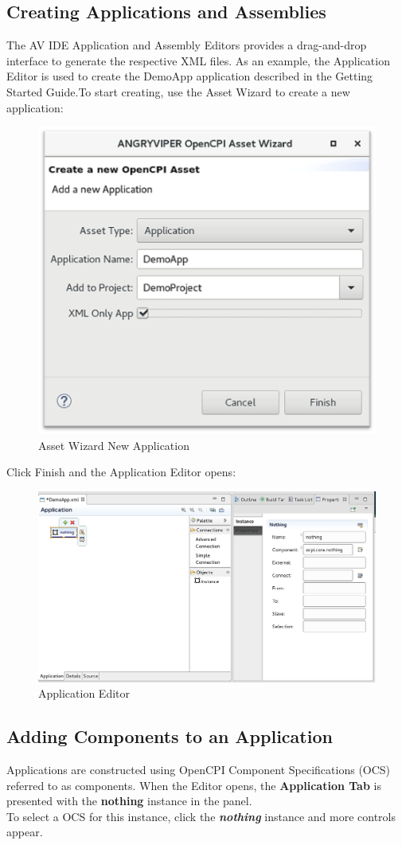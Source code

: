\documentclass[10pt, a4paper, oneside]{article}
\begin{document}
\subsection{Creating Applications and Assemblies}
The AV IDE Application and Assembly Editors provides a drag-and-drop interface to generate the respective XML files. As an example, the Application Editor is used to create the DemoApp application described in the Getting Started Guide.To start creating, use the Asset Wizard to create a new application:\\
\begin{figure}[h!]
	\centering
	\caption{Asset Wizard New Application}{}
	\includegraphics[width=.65\textwidth]{Application_Asset.png}
 \end{figure}

Click Finish and the Application Editor opens:
\begin{figure}[h!]
	\centering
	\caption{Application Editor}{}
	\includegraphics[width=.65\textwidth]{ApplicationEditor.png}
 \end{figure}

\subsection{Adding Components to an Application}
Applications are constructed using OpenCPI Component Specifications (OCS) referred to as components. When the Editor opens, the \textbf{Application Tab} is presented with the \textbf{nothing} instance in the panel.\\
To select a OCS for this instance, click the \textbf{\emph{nothing}} instance and more controls appear. \\
\end{document}
